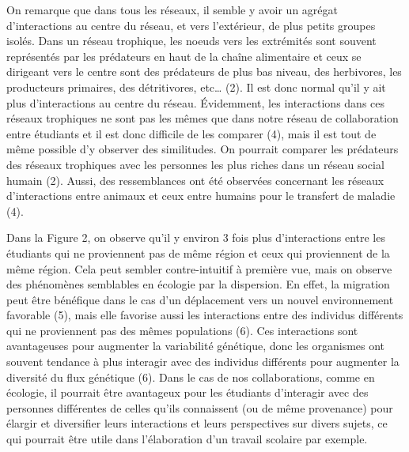 \documentclass[9pt,twocolumn,twoside,]{pnas-new}
\begin{document}
On remarque que dans tous les réseaux, il semble y avoir un agrégat
d'interactions au centre du réseau, et vers l'extérieur, de plus petits
groupes isolés. Dans un réseau trophique, les noeuds vers les extrémités
sont souvent représentés par les prédateurs en haut de la chaîne
alimentaire et ceux se dirigeant vers le centre sont des prédateurs de
plus bas niveau, des herbivores, les producteurs primaires, des
détritivores, etc\ldots{} (2). Il est donc normal qu'il y ait plus
d'interactions au centre du réseau. Évidemment, les interactions dans
ces réseaux trophiques ne sont pas les mêmes que dans notre réseau de
collaboration entre étudiants et il est donc difficile de les comparer
(4), mais il est tout de même possible d'y observer des similitudes. On
pourrait comparer les prédateurs des réseaux trophiques avec les
personnes les plus riches dans un réseau social humain (2). Aussi, des
ressemblances ont été observées concernant les réseaux d'interactions
entre animaux et ceux entre humains pour le transfert de maladie (4).

Dans la Figure 2, on observe qu'il y environ 3 fois plus d'interactions
entre les étudiants qui ne proviennent pas de même région et ceux qui
proviennent de la même région. Cela peut sembler contre-intuitif à
première vue, mais on observe des phénomènes semblables en écologie par
la dispersion. En effet, la migration peut être bénéfique dans le cas
d'un déplacement vers un nouvel environnement favorable (5), mais elle
favorise aussi les interactions entre des individus différents qui ne
proviennent pas des mêmes populations (6). Ces interactions sont
avantageuses pour augmenter la variabilité génétique, donc les
organismes ont souvent tendance à plus interagir avec des individus
différents pour augmenter la diversité du flux génétique (6). Dans le
cas de nos collaborations, comme en écologie, il pourrait être
avantageux pour les étudiants d'interagir avec des personnes différentes
de celles qu'ils connaissent (ou de même provenance) pour élargir et
diversifier leurs interactions et leurs perspectives sur divers sujets,
ce qui pourrait être utile dans l'élaboration d'un travail scolaire par
exemple.
\end{document}
